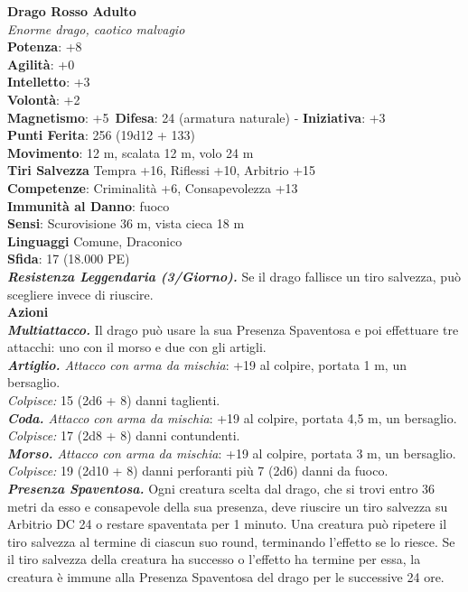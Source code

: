 \begin{multicols}{2}
\medskip\textbf{Drago Rosso Adulto}\\
\emph{Enorme drago, caotico malvagio}\\
\textbf{Potenza}: +8\\
\textbf{Agilità}: +0\\
\textbf{Intelletto}: +3\\
\textbf{Volontà}: +2\\
\textbf{Magnetismo}: +5\
\textbf{Difesa}: 24 (armatura naturale) - \textbf{Iniziativa}: +3\\
\textbf{Punti Ferita}: 256 (19d12 + 133)\\
\textbf{Movimento}: 12 m, scalata 12 m, volo 24 m\\
\textbf{Tiri Salvezza} Tempra +16, Riflessi +10, Arbitrio +15\\
\textbf{Competenze}: Criminalità +6, Consapevolezza +13\\
\textbf{Immunità al Danno}: fuoco\\
\textbf{Sensi}: Scurovisione 36 m, vista cieca 18 m\\
\textbf{Linguaggi} Comune, Draconico\\
\textbf{Sfida}: 17 (18.000 PE)\smallskip\\
\emph{\textbf{Resistenza Leggendaria (3/Giorno).}} Se il drago fallisce un tiro salvezza, può scegliere invece di riuscire.\\
\smallskip\textbf{Azioni}\\
\emph{\textbf{Multiattacco.}} Il drago può usare la sua Presenza Spaventosa e poi effettuare tre attacchi: uno con il morso e due con gli artigli.\\
\emph{\textbf{Artiglio.} Attacco con arma da mischia}: +19 al colpire, portata 1 m, un bersaglio.\\
\emph{Colpisce:} 15 (2d6 + 8) danni taglienti.\\
\emph{\textbf{Coda.} Attacco con arma da mischia}: +19 al colpire, portata 4,5 m, un bersaglio.\\
\emph{Colpisce:} 17 (2d8 + 8) danni contundenti.\\
\emph{\textbf{Morso.} Attacco con arma da mischia}: +19 al colpire, portata 3 m, un bersaglio.\\
\emph{Colpisce:} 19 (2d10 + 8) danni perforanti più 7 (2d6) danni da fuoco.\\
\emph{\textbf{Presenza Spaventosa.}} Ogni creatura scelta dal drago, che si trovi entro 36 metri da esso e consapevole della sua presenza, deve riuscire un tiro salvezza su Arbitrio DC  24 o restare spaventata per 1 minuto. Una creatura può ripetere il tiro salvezza al termine di ciascun suo round, terminando l'effetto se lo riesce. Se il tiro salvezza della creatura ha successo o l'effetto ha termine per essa, la creatura è immune alla Presenza Spaventosa del drago per le successive 24 ore.\\

\end{multicols}

